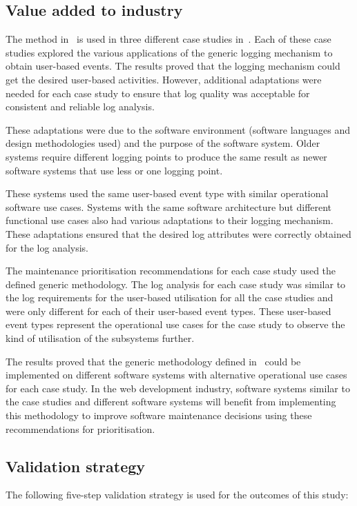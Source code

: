 \subsection{Value added to industry}
The method in~ is used in three different case studies in~. Each of these case studies explored the various applications of the generic logging mechanism to obtain user-based events. The results proved that the logging mechanism could get the desired user-based activities. However, additional adaptations were needed for each case study to ensure that log quality was acceptable for consistent and reliable log analysis. \par These adaptations were due to the software environment (software languages and design methodologies used) and the purpose of the software system. Older systems require different logging points to produce the same result as newer software systems that use less or one logging point. \par These systems used the same user-based event type with similar operational software use cases. Systems with the same software architecture but different functional use cases also had various adaptations to their logging mechanism. These adaptations ensured that the desired log attributes were correctly obtained for the log analysis. \par The maintenance prioritisation recommendations for each case study used the defined generic methodology. The log analysis for each case study was similar to the log requirements for the user-based utilisation for all the case studies and were only different for each of their user-based event types. These user-based event types represent the operational use cases for the case study to observe the kind of utilisation of the subsystems further. \par The results proved that the generic methodology defined in~ could be implemented on different software systems with alternative operational use cases for each case study. In the web development industry, software systems similar to the case studies and different software systems will benefit from implementing this methodology to improve software maintenance decisions using these recommendations for prioritisation.

\subsection{Validation strategy}
The following five-step validation strategy is used for the outcomes of this study:


